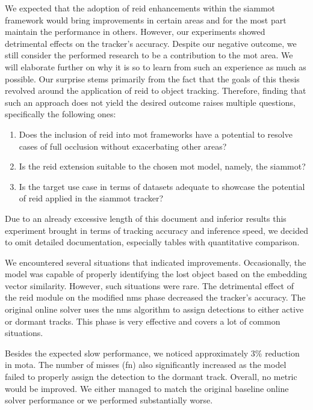 We expected that the adoption of \gls{reid} enhancements within the \gls{siammot} framework would bring improvements in certain areas and for the most part maintain the performance in others. However, our experiments showed detrimental effects on the tracker's accuracy. Despite our negative outcome, we still consider the performed research to be a contribution to the \gls{mot} area. We will elaborate further on why it is so to learn from such an experience as much as possible. Our surprise stems primarily from the fact that the goals of this thesis revolved around the application of \gls{reid} to object tracking. Therefore, finding that such an approach does not yield the desired outcome raises multiple questions, specifically the following ones:
\begin{enumerate}
    \item Does the inclusion of \gls{reid} into \gls{mot} frameworks have a potential to resolve cases of full occlusion without exacerbating other areas?
    \item Is the \gls{reid} extension suitable to the chosen \gls{mot} model, namely, the \gls{siammot}?
    \item Is the target use case in terms of datasets adequate to showcase the potential of \gls{reid} applied in the \gls{siammot} tracker?
\end{enumerate}

Due to an already excessive length of this document and inferior results this experiment brought in terms of tracking accuracy and inference speed, we decided to omit detailed documentation, especially tables with quantitative comparison.

We encountered several situations that indicated improvements. Occasionally, the model was capable of properly identifying the lost object based on the embedding vector similarity. However, such situations were rare. The detrimental effect of the \gls{reid} module on the modified \gls{nms} phase decreased the tracker's accuracy. The original online solver uses the \gls{nms} algorithm to assign detections to either active or dormant tracks. This phase is very effective and covers a lot of common situations.

Besides the expected slow performance, we noticed approximately $3$\% reduction in \gls{mota}. The number of misses (\gls{fn}) also significantly increased as the model failed to properly assign the detection to the dormant track. Overall, no metric would be improved. We either managed to match the original baseline online solver performance or we performed substantially worse.

